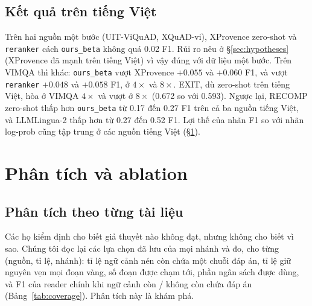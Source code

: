 \documentclass[11pt]{article}
\newcommand{\arm}[1]{\texttt{#1}}
\begin{document}
\subsection{Kết quả trên tiếng Việt}
Trên hai nguồn một bước (UIT-ViQuAD, XQuAD-vi), XProvence zero-shot và \arm{reranker} cách
\arm{ours\_beta} không quá 0.02 F1. Rủi ro nêu ở \S\ref{sec:hypotheses} (XProvence đã mạnh trên tiếng
Việt) vì vậy đúng với dữ liệu một bước. Trên VIMQA thì khác: \arm{ours\_beta} vượt XProvence $+0.055$ và
$+0.060$ F1, và vượt \arm{reranker} $+0.048$ và $+0.058$ F1, ở $4\times$ và $8\times$. EXIT, dù zero-shot
trên tiếng Việt, hòa ở VIMQA $4\times$ và vượt ở $8\times$ (0.672 so với 0.593). Ngược lại, RECOMP
zero-shot thấp hơn \arm{ours\_beta} từ 0.17 đến 0.27 F1 trên cả ba nguồn tiếng Việt, và LLMLingua-2
thấp hơn từ 0.27 đến 0.52 F1. Lợi thế của nhãn F1 so với nhãn log-prob cũng tập trung ở các nguồn tiếng Việt
(\S\ref{sec:ablation}).

\section{Phân tích và ablation}
\label{sec:ablation}

\subsection{Phân tích theo từng tài liệu}
\label{sec:diagnosis}
Các họ kiểm định cho biết giả thuyết nào không đạt, nhưng không cho biết vì sao. Chúng tôi đọc lại các lựa
chọn đã lưu của mọi nhánh và đo, cho từng (nguồn, tỉ lệ, nhánh): tỉ lệ ngữ cảnh nén còn chứa một chuỗi đáp
án, tỉ lệ giữ nguyên vẹn mọi đoạn vàng, số đoạn được chạm tới, phần ngân sách được dùng, và F1 của reader
chính khi ngữ cảnh còn / không còn chứa đáp án (Bảng~\ref{tab:coverage}). Phân tích này là khám phá.
\end{document}
